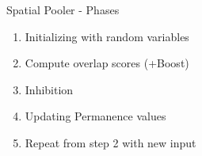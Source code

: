 \begin{frame}[c]{Spatial Pooler - Phases}
    \Large
    \begin{enumerate}[<+(1)->]
        \item Initializing with random variables
        \item Compute overlap scores (+Boost)
        \item Inhibition
        \item Updating Permanence values
        \item Repeat from step 2 with new input
    \end{enumerate}
\end{frame}






% 
% 
% 
% 
% 
% 
% 





